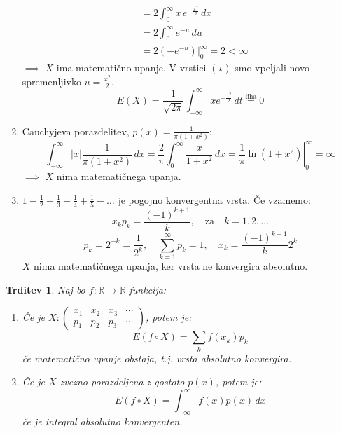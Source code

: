 \documentclass[12pt]{book}
\theoremstyle{definition}
\theoremstyle{plain}
\theoremstyle{plain}
\newtheorem{trditev}{Trditev}
\theoremstyle{plain}
\theoremstyle{remark}
\begin{document}
\begin{zgled}
\begin{enumerate}
\begin{align*}
            &=2 \int_0^{\infty} x \, e^{-\frac{x^2}{2}} \, d x \\
            &=2 \int_0^{\infty} e^{-u} \, d u \tag{$\star$} \\
            &=\left.2 \left(-e^{-u}\right)\right|_0 ^{\infty}=2<\infty
        \end{align*}
        $\implies$ $X$ ima matematično upanje. V vrstici $(\star)$ smo vpeljali novo spremenljivko $u=\frac{x^2}{2}$.
        $$
        E(X)=\frac{1}{\sqrt{2 \pi}} \int_{-\infty}^{\infty} x e^{-\frac{x^2}{2}} \, d t \stackrel{\text{liha}}{=} 0
        $$
        \item Cauchyjeva porazdelitev, $p(x)=\frac{1}{\pi\left(1+x^2\right)}$:
        $$
        \int_{-\infty}^{\infty}|x| \frac{1}{\pi\left(1+x^2\right)} \, d x =\frac{2}{\pi} \int_0^{\infty} \frac{x}{1+x^2} \, d x = \left.\frac{1}{\pi} \ln \left(1+x^2\right)\right|_0 ^{\infty}=\infty
        $$
        $\implies$ $X$ nima matematičnega upanja.
        \item $1-\frac{1}{2}+\frac{1}{3}-\frac{1}{4}+\frac{1}{5}-\ldots$ je pogojno konvergentna vrsta. Če vzamemo: 
        $$
        x_k p_k=\frac{(-1)^{k+1}}{k}, \quad \text{za} \quad k=1,2,\ldots
        $$
        $$
        p_k=2^{-k}=\frac{1}{2^k}, \quad \sum_{k=1}^{\infty} p_k=1, \quad x_k=\frac{(-1)^{k+1}}{k} 2^k
        $$
        $X$ nima matematičnega upanja, ker vrsta ne konvergira absolutno. 
    \end{enumerate}
\end{zgled}

\begin{trditev}
    Naj bo $f: \mathbb{R} \rightarrow \mathbb{R}$ funkcija: 
    \begin{enumerate}[label=(\alph*)]
        \item Če je 
            $X:\left(\begin{array}{cccc}
            x_1 & x_2 & x_3 & \cdots \\
            p_1 & p_2 & p_3 & \cdots
            \end{array}\right)$, potem je:
        $$
        E(f \circ X)=\sum_k f(x_k) p_k
        $$
        če matematično upanje obstaja, t.j. vrsta absolutno konvergira.
        \item Če je $X$ zvezno porazdeljena z gostoto $p(x)$, potem je: 
        $$
        E\left(f \circ X\right)=\int_{-\infty}^{\infty} f(x) p(x) \, d x
        $$
        če je integral absolutno konvergenten.
    \end{enumerate}
\end{trditev}
\end{document}
